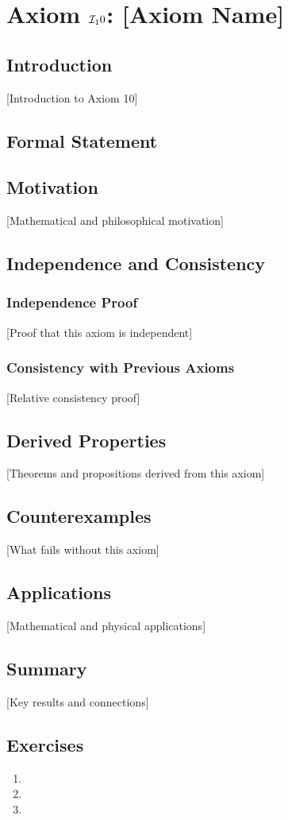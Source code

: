 \chapter{Axiom $\mathcal{I}_10$: [Axiom Name]}
\label{ch:axiom-I10}

\section{Introduction}
[Introduction to Axiom 10]

\section{Formal Statement}
\begin{axiom}
\end{axiom}

\section{Motivation}
[Mathematical and philosophical motivation]

\section{Independence and Consistency}
\subsection{Independence Proof}
[Proof that this axiom is independent]

\subsection{Consistency with Previous Axioms}
[Relative consistency proof]

\section{Derived Properties}
[Theorems and propositions derived from this axiom]

\section{Counterexamples}
[What fails without this axiom]

\section{Applications}
[Mathematical and physical applications]

\section{Summary}
[Key results and connections]

\section{Exercises}
\begin{enumerate}
\item [Exercise 1]
\item [Exercise 2]
\item [Exercise 3]
\end{enumerate}

